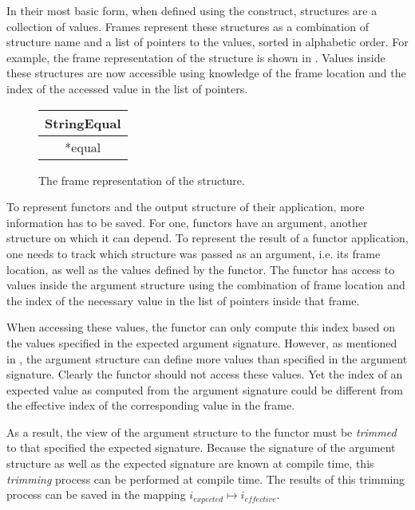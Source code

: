 \documentclass[10pt,a4paper,master=cws, masteroption=ai,english,inputenc=utf8]{kulemt}
\begin{document}
In their most basic form, when defined using the  construct, structures are a collection of values.
Frames represent these structures as a combination of structure name and a list of pointers to the values, sorted in alphabetic order.
For example, the frame representation of the  structure is shown in .
Values inside these structures are now accessible using knowledge of the frame location and the index of the accessed value in the list of pointers.

\begin{figure}[H]
\centering
\begin{tabular}{|c|}
\hline
StringEqual \\
\hline
*equal \\
\hline
\end{tabular}
\caption{The frame representation of the  structure.\label{fig:StringEqualFrame}}
\end{figure}

To represent functors and the output structure of their application, more information has to be saved. 
For one, functors have an argument, another structure on which it can depend.
To represent the result of a functor application, one needs to track which structure was passed as an argument, i.e. its frame location, as well as the values defined by the functor.
The functor has access to values inside the argument structure using the combination of frame location and the index of the necessary value in the list of pointers inside that frame.

When accessing these values, the functor can only compute this index based on the values specified in the expected argument signature.
However, as mentioned in , the argument structure can define more values than specified in the argument signature.
Clearly the functor should not access these values.
Yet the index of an expected value as computed from the argument signature could be different from the effective index of the corresponding value in the frame.

As a result, the view of the argument structure to the functor must be \emph{trimmed} to that specified the expected signature. 
Because the signature of the argument structure as well as the expected signature are known at compile time, this \emph{trimming} process can be performed at compile time.
The results of this trimming process can be saved in the mapping $i_{expected} \mapsto i_{effective}$.
\end{document}
